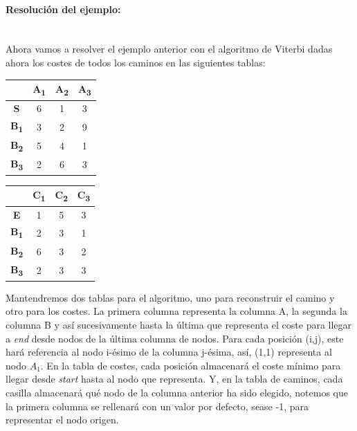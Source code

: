 \documentclass{article}
\newcommand{\myparagraph}[1]{\paragraph{#1}\mbox{}\\}
\begin{document}
\myparagraph{Resolución del ejemplo: }

Ahora vamos a resolver el ejemplo anterior con el algoritmo de Viterbi dadas
ahora los costes de todos los caminos en las siguientes tablas:

\begin{table}[h!]
\centering

\begin{subtable}[t]{0.45\textwidth}
\centering
\begin{tabular}{|c|c|c|c|}
\hline
     & \textbf{A\textsubscript{1}} & \textbf{A\textsubscript{2}} & \textbf{A\textsubscript{3}} \\ \hline
\textbf{S}    & 6    & 1    & 3    \\ \hline
\textbf{B\textsubscript{1}} & 3    & 2    & 9    \\ \hline
\textbf{B\textsubscript{2}} & 5    & 4    & 1    \\ \hline
\textbf{B\textsubscript{3}} & 2    & 6    & 3    \\ \hline
\end{tabular}
\end{subtable}
\hspace{5mm}
\begin{subtable}[t]{0.45\textwidth}
\centering
\begin{tabular}{|c|c|c|c|}
\hline
     & \textbf{C\textsubscript{1}} & \textbf{C\textsubscript{2}} & \textbf{C\textsubscript{3}} \\ \hline
\textbf{E}    & 1    & 5    & 3    \\ \hline
\textbf{B\textsubscript{1}} & 2    & 3    & 1    \\ \hline
\textbf{B\textsubscript{2}} & 6    & 3    & 2    \\ \hline
\textbf{B\textsubscript{3}} & 2    & 3    & 3    \\ \hline
\end{tabular}
\end{subtable}
\end{table}

Mantendremos dos tablas para el algoritmo, uno para reconstruir el camino 
y otro para los costes. La primera columna representa la columna A, la segunda
la columna B y así sucesivamente hasta la última que representa el coste 
para llegar a \textit{end} desde nodos de la última columna de nodos.
Para cada posición (i,j), este hará referencia al nodo i-ésimo de la columna j-ésima, así, (1,1) representa al 
nodo $A_1$. En la tabla de costes, cada posición almacenará el coste 
mínimo para llegar desde \textit{start} hasta al nodo que representa. Y, en 
la tabla de caminos, cada casilla almacenará qué nodo de la columna anterior ha sido 
elegido, notemos que la primera columna se rellenará con un valor por defecto,
sease -1, para representar el nodo origen.
\end{document}
